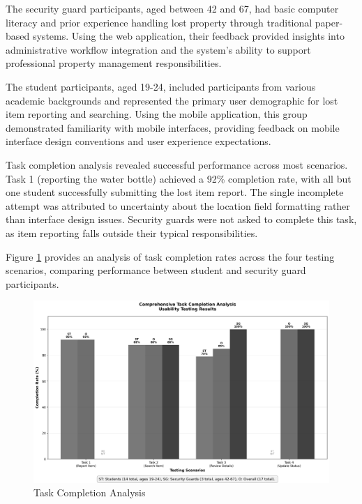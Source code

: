 The security guard participants, aged between 42 and 67, had basic computer literacy and prior experience handling lost property through traditional paper-based systems. Using the web application, their feedback provided insights into administrative workflow integration and the system's ability to support professional property management responsibilities.

The student participants, aged 19-24, included participants from various academic backgrounds and represented the primary user demographic for lost item reporting and searching. Using the mobile application, this group demonstrated familiarity with mobile interfaces, providing feedback on mobile interface design conventions and user experience expectations.

Task completion analysis revealed successful performance across most scenarios. Task 1 (reporting the water bottle) achieved a 92\% completion rate, with all but one student successfully submitting the lost item report. The single incomplete attempt was attributed to uncertainty about the location field formatting rather than interface design issues. Security guards were not asked to complete this task, as item reporting falls outside their typical responsibilities.

Figure \ref{fig:task_completion} provides an analysis of task completion rates across the four testing scenarios, comparing performance between student and security guard participants.

\begin{figure}[htbp]
    \centering
    \includegraphics[width=\textwidth]{figs/chapter5/comprehensive_task_completion.png}
    \caption{Task Completion Analysis}
    \label{fig:task_completion}
\end{figure}

